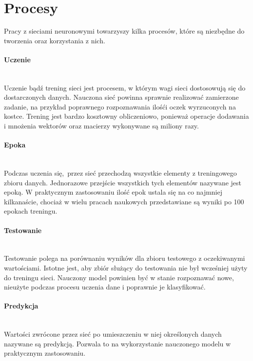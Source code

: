 \section{Procesy}

Pracy z sieciami neuronowymi towarzyszy kilka procesów, które są niezbędne do tworzenia
oraz korzystania z nich.

\paragraph{Uczenie} \mbox{}\\
Uczenie bądź trening sieci jest procesem, w którym wagi sieci dostosowują się do dostarczonych danych.
Nauczona sieć powinna sprawnie realizować zamierzone zadanie, na przykład poprawnego
rozpoznawania ilośći oczek wyrzuconych na kostce. Trening jest bardzo kosztowny obliczeniowo,
ponieważ operacje dodawania i mnożenia wektorów oraz macierzy wykonywane są miliony razy.

\paragraph{Epoka} \mbox{}\\
Podczas uczenia się, przez sieć przechodzą wszystkie elementy z treningowego zbioru danych.
Jednorazowe przejście wszystkich tych elementów nazywane jest epoką. W praktycznym zastosowaniu
ilość epok ustala się na co najmniej kilkanaście, chociaż w wielu pracach naukowych przedstawiane
są wyniki po 100 epokach treningu.

\paragraph{Testowanie} \mbox{}\\
Testowanie polega na porównaniu wyników dla zbioru testowego z oczekiwanymi wartościami.
Istotne jest, aby zbiór służący do testowania nie był wcześniej użyty do treningu sieci.
Nauczony model powinien być w stanie rozpoznawać nowe, nieużyte podczas procesu uczenia
dane i poprawnie je klasyfikować.

\paragraph{Predykcja} \mbox{}\\
Wartości zwrócone przez sieć po umieszczeniu w niej określonych danych nazywane są
predykcją. Pozwala to na wykorzystanie nauczonego modelu w praktycznym zastosowaniu.

